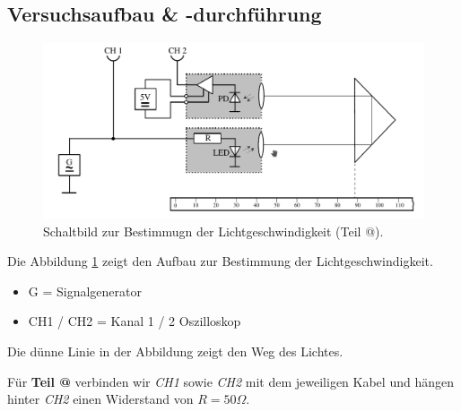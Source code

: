 \documentclass[10pt,a4paper]{article}
\makeatletter
\newcommand*{\rom}[1]{\expandafter\@slowromancap\romannumeral #1@}
\makeatother
\begin{document}
\subsection{Versuchsaufbau \& -durchführung}
\begin{flushleft}
\begin{figure}[H]
\centering
\includegraphics[scale=0.4]{schaltbild_licht}
\caption{Schaltbild zur Bestimmugn der Lichtgeschwindigkeit (Teil \rom{1}).}
\label{fig:licht}
\end{figure}
Die Abbildung \ref{fig:licht} zeigt den Aufbau zur Bestimmung der Lichtgeschwindigkeit.
\begin{itemize}
\item G = Signalgenerator
\item CH1 / CH2 = Kanal 1 / 2 Oszilloskop
\end{itemize}
Die dünne Linie in der Abbildung zeigt den Weg des Lichtes.

\vspace{4pt}

Für \textbf{Teil \rom{2}} verbinden wir \textit{CH1} sowie \textit{CH2} mit dem jeweiligen Kabel und hängen hinter \textit{CH2} einen Widerstand von $R = 50 \Omega$.
\end{flushleft}
\end{document}
